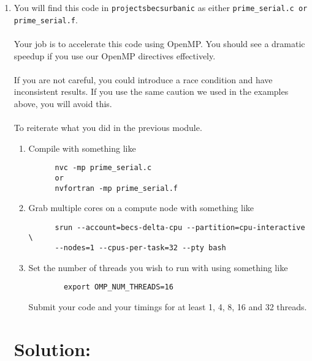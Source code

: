 \documentclass[11pt]{article}
\begin{document}
\begin{enumerate}
  \item{You will find this code in \texttt{\/projects\/becs\/urbanic} as either \texttt{prime\_serial.c or prime\_serial.f}.
  \\
  \\Your job is to accelerate this code using OpenMP. You should see a dramatic speedup if you use our OpenMP directives effectively.
  \\
  \\If you are not careful, you could introduce a race condition and have inconsistent results. If you use the same caution we used in the examples above, you will avoid this.
  \\
  \\To reiterate what you did in the previous module.
  \begin{enumerate}
    \item {Compile with something like
    \begin{verbatim}
      nvc -mp prime_serial.c
      or
      nvfortran -mp prime_serial.f
    \end{verbatim}
    }
    \item {Grab multiple cores on a compute node with something like
    \begin{verbatim}
      srun --account=becs-delta-cpu --partition=cpu-interactive \
      --nodes=1 --cpus-per-task=32 --pty bash
    \end{verbatim}
    }
    \item {Set the number of threads you wish to run with using something like
    \begin{verbatim}
        export OMP_NUM_THREADS=16
    \end{verbatim}
    }
    Submit your code and your timings for at least 1, 4, 8, 16 and 32 threads.
  \end{enumerate}

\section{Solution:}



}
\end{enumerate}
\end{document}
